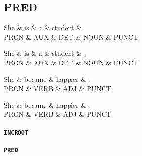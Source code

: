 \subsection{PRED}
\begin{dependency}
	\begin{deptext}
	She \& is \& a \& student \& .\\
	PRON \& AUX \& DET \& NOUN \& PUNCT\\
	\end{deptext}
\end{dependency}

\begin{dependency}
	\begin{deptext}
	She \& is \& a \& student \& .\\
	PRON \& AUX \& DET \& NOUN \& PUNCT\\
	\end{deptext}
\end{dependency}

\begin{dependency}
	\begin{deptext}
	She \& became \& happier \& .\\
	PRON \& VERB \& ADJ \& PUNCT\\
	\end{deptext}
\end{dependency}

\begin{dependency}
	\begin{deptext}
	She \& became \& happier \& .\\
	PRON \& VERB \& ADJ \& PUNCT\\
	\end{deptext}
\end{dependency}

\paragraph{\texttt{INCROOT}}

\paragraph{\texttt{PRED}}
